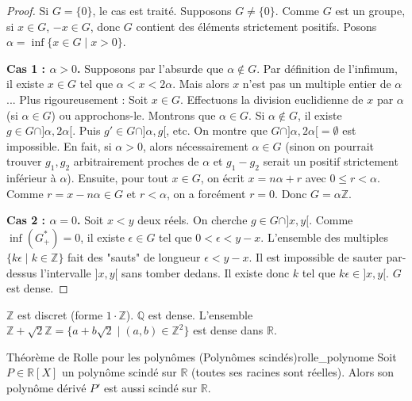 \documentclass{prepacours}
\begin{document}
\begin{proof}
    Si $G = \{0\}$, le cas est traité. Supposons $G \neq \{0\}$. Comme $G$ est un groupe, si $x \in G$, $-x \in G$, donc $G$ contient des éléments strictement positifs.
    Posons $\alpha = \inf \{x \in G \mid x > 0\}$.
    
    \textbf{Cas 1 : $\alpha > 0$.}
    Supposons par l'absurde que $\alpha \notin G$. Par définition de l'infimum, il existe $x \in G$ tel que $\alpha < x < 2\alpha$. Mais alors $x$ n'est pas un multiple entier de $\alpha$...
    Plus rigoureusement : Soit $x \in G$. Effectuons la division euclidienne de $x$ par $\alpha$ (si $\alpha \in G$) ou approchons-le.
    Montrons que $\alpha \in G$. Si $\alpha \notin G$, il existe $g \in G \cap ]\alpha, 2\alpha[$. Puis $g' \in G \cap ]\alpha, g[$, etc. On montre que $G \cap ]\alpha, 2\alpha[ = \emptyset$ est impossible.
    En fait, si $\alpha > 0$, alors nécessairement $\alpha \in G$ (sinon on pourrait trouver $g_1, g_2$ arbitrairement proches de $\alpha$ et $g_1-g_2$ serait un positif strictement inférieur à $\alpha$).
    Ensuite, pour tout $x \in G$, on écrit $x = n\alpha + r$ avec $0 \le r < \alpha$. Comme $r = x - n\alpha \in G$ et $r < \alpha$, on a forcément $r=0$. Donc $G = \alpha\mathbb{Z}$.

    \textbf{Cas 2 : $\alpha = 0$.}
    Soit $x < y$ deux réels. On cherche $g \in G \cap ]x, y[$.
    Comme $\inf(G_+^*) = 0$, il existe $\epsilon \in G$ tel que $0 < \epsilon < y-x$.
    L'ensemble des multiples $\{k\epsilon \mid k \in \mathbb{Z}\}$ fait des "sauts" de longueur $\epsilon < y-x$.
    Il est impossible de sauter par-dessus l'intervalle $]x, y[$ sans tomber dedans. Il existe donc $k$ tel que $k\epsilon \in ]x, y[$. $G$ est dense.
\end{proof}

\begin{exemple}
    $\mathbb{Z}$ est discret (forme $1\cdot\mathbb{Z}$). $\mathbb{Q}$ est dense. L'ensemble $\mathbb{Z} + \sqrt{2}\mathbb{Z} = \{a + b\sqrt{2} \mid (a,b) \in \mathbb{Z}^2\}$ est dense dans $\mathbb{R}$.
\end{exemple}

\begin{proposition}{Théorème de Rolle pour les polynômes (Polynômes scindés)}{rolle_polynome}
    Soit $P \in \mathbb{R}[X]$ un polynôme scindé sur $\mathbb{R}$ (toutes ses racines sont réelles).
    Alors son polynôme dérivé $P'$ est aussi scindé sur $\mathbb{R}$.
\end{proposition}
\end{document}
